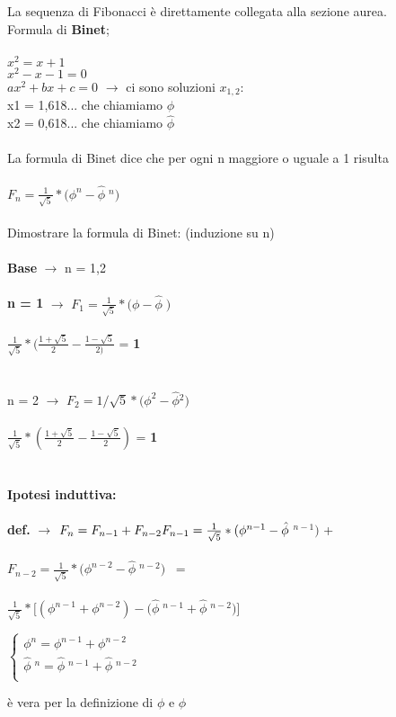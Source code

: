 \documentclass[12pt, letterpaper]{article}
\begin{document}
La sequenza di Fibonacci è direttamente collegata alla sezione aurea.
\\Formula di \textbf{Binet};
\\
\\\(x^2 = x + 1\)
\\\(x^2 - x - 1 = 0\)
\\\(ax^2 + bx + c = 0\) $\rightarrow$ ci\; sono\; soluzioni\; \(x_{1,2}\):\\
x1 = 1,618... che chiamiamo $\phi$
\\x2 = 0,618... che\; chiamiamo\; $\hat{\phi}$\(\)\\
\\La formula di Binet dice che per ogni n maggiore o uguale a 1 risulta
\\
\\
\(F_n = \frac{1}{\sqrt{5}} * (\phi^n - \hat{\phi}\)\(\;^n)\)
\\
\\
Dimostrare la formula di Binet: (induzione su n)\\\\
\textbf{Base} $\rightarrow$ n = 1,2
\\
\\\textbf{n = 1} $\rightarrow$ \(F_1 = \frac{1}{\sqrt{5}} * (\phi - \hat{\phi}\)\(\;)\)
\\
\\\(\frac{1}{\sqrt{5}} * (\frac{1+\sqrt{5}}{2} - \frac{1-\sqrt{5}}{2)}\) = \textbf{1}
\\
\\
\\
n = 2 $\rightarrow$ \(F_2 = 1/\sqrt{5} * (\phi^2 - \hat{\phi}\)\(^2)\)
\\
\\\(\frac{1}{\sqrt{5}} * (\frac{1+\sqrt{5}}{2} - \frac{1-\sqrt{5}}{2})\) = \textbf{1}
\\
\\
\\\textbf{Ipotesi induttiva:}
\\
\\
\textbf{def.} $\rightarrow$ \(F_n = F_{n-1} + F_{n-2}  
\\
\\F_{n-1} = \frac{1}{\sqrt{5}} * (\phi^{n-1} - \hat{\phi}\)\(\;^{n-1})\) \;\; + 
\\
\\
\(
F_{n-2} = \frac{1}{\sqrt{5}} * (\phi^{n-2} - \hat{\phi}\)\(\;^{n-2}) \;\; =\)
\\
\\
\(
\frac{1}{\sqrt{5}} * [(\phi^{n-1} + \phi^{n-2}) - (\hat{\phi}\)\(\;^{n-1} + \hat{\phi}\)\(\;^{n-2})]
\)
\begin{center}
   $\left \{
\begin{array}{l}
\phi^n = \phi^{n-1} + \phi^{n-2}\\
   \hat{\phi}\;^n = \hat{\phi}\;^{n-1} + \hat{\phi}\;^{n-2}\\
\end{array}
\right.$
\end{center}
è vera per la definizione di $\phi$ e $\hat{\phi}$
\newpage
\end{document}
